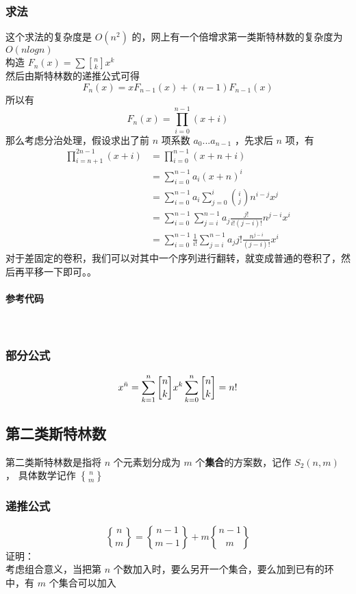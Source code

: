 	\subsubsection{求法}
	这个求法的复杂度是 $O(n^2)$ 的，网上有一个倍增求第一类斯特林数的复杂度为 $O(nlogn)$ \\
	构造 $F_n(x)=\sum {n\brack k}x^k$\\
	然后由斯特林数的递推公式可得
	$$
	F_n(x)=xF_{n-1}(x)+(n-1)F_{n-1}(x)
	$$
	所以有
	$$
	F_n(x)=\prod_{i=0}^{n-1}(x+i)
	$$
	那么考虑分治处理，假设求出了前 $n$ 项系数 $a_0...a_{n-1}$ ，先求后 $n$ 项，有
	$$
	\begin{aligned}
	\prod_{i=n+1}^{2n-1}(x+i)&=\prod_{i=0}^{n-1}(x+n+i)
	\\&=\sum_{i=0}^{n-1}a_i(x+n)^i
	\\&=\sum_{i=0}^{n-1}a_i\sum_{j=0}^{i}\binom{i}{j}n^{i-j}x^j
	\\&=\sum_{i=0}^{n-1}\sum_{j=i}^{n-1}a_j\frac{j!}{i!(j-i)!}n^{j-i}x^i
	\\&=\sum_{i=0}^{n-1}\frac{1}{i!}\sum_{j=i}^{n-1}a_jj!\frac{n^{j-i}}{(j-i)!}x^i
	\end{aligned}
	$$
	对于差固定的卷积，我们可以对其中一个序列进行翻转，就变成普通的卷积了，然后再平移一下即可。。\\
	\paragraph{参考代码}~\\
	
	\vspace{1cm}
	\subsubsection{部分公式}
	
	$$
	x^{\bar{n}}=\sum_{k=1}^n{n\brack k}x^k\\
	\sum_{k=0}^n{n\brack k}=n!
	$$
	\newpage
	\subsection{第二类斯特林数}
	第二类斯特林数是指将 $n$ 个元素划分成为 $m$ 个\textbf{集合}的方案数，记作 $S_2(n,m)$ ， 具体数学记作 $n\brace m$ 
	\subsubsection{递推公式}
	$$
	{n\brace m}={n-1\brace m-1}+m{n-1\brace m}
	$$
	证明：\\
	考虑组合意义，当把第 $n$ 个数加入时，要么另开一个集合，要么加到已有的环中，有 $m$ 个集合可以加入
